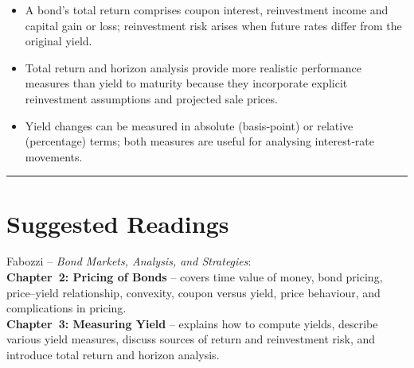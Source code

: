 \documentclass[
  letterpaper,
  DIV=11,
  numbers=noendperiod]{scrartcl}
\begin{document}
\begin{itemize}
  Portfolio yield is obtained by discounting the combined cash‑flows of
  the portfolio; cash‑flow yield and discount margin adapt the yield
  concept to amortising and floating‑rate securities.
\item
  A bond's total return comprises coupon interest, reinvestment income
  and capital gain or loss; reinvestment risk arises when future rates
  differ from the original yield.
\item
  Total return and horizon analysis provide more realistic performance
  measures than yield to maturity because they incorporate explicit
  reinvestment assumptions and projected sale prices.
\item
  Yield changes can be measured in absolute (basis‑point) or relative
  (percentage) terms; both measures are useful for analysing
  interest‑rate movements.
\end{itemize}

\begin{center}\rule{0.5\linewidth}{0.5pt}\end{center}

\section{Suggested Readings}\label{suggested-readings}

Fabozzi -- \emph{Bond Markets, Analysis, and Strategies}:\\
\textbf{Chapter~2: Pricing of Bonds} -- covers time value of money, bond
pricing, price--yield relationship, convexity, coupon versus yield,
price behaviour, and complications in pricing.\\
\textbf{Chapter~3: Measuring Yield} -- explains how to compute yields,
describe various yield measures, discuss sources of return and
reinvestment risk, and introduce total return and horizon analysis.
\end{document}
